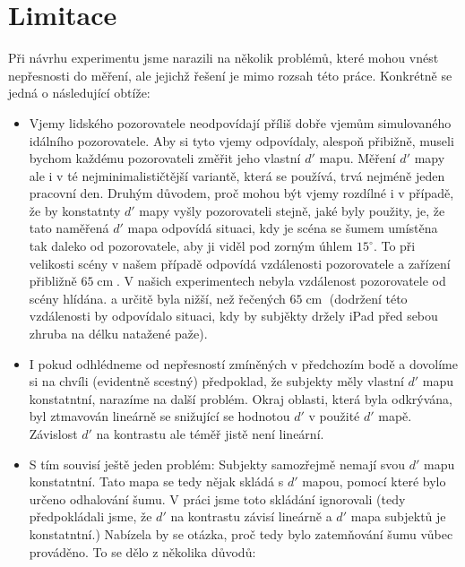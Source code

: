 \section{Limitace}

Při návrhu experimentu jsme narazili na několik problémů, které mohou vnést
nepřesnosti do měření, ale jejichž řešení je mimo rozsah této práce. Konkrétně
se jedná o následující obtíže:

\begin{itemize}
\item Vjemy lidského pozorovatele neodpovídají příliš dobře vjemům simulovaného
idálního pozorovatele. Aby si tyto vjemy odpovídaly, alespoň přibižně, museli
bychom každému pozorovateli změřit jeho vlastní $d'$ mapu. Měření $d'$ mapy ale
i  v té nejminimalističtější variantě, která se používá, trvá nejméně jeden
pracovní den. Druhým důvodem, proč mohou být vjemy rozdílné i v případě, že by
konstatnty $d'$ mapy vyšly pozorovateli stejně, jaké byly použity, je, že tato
naměřená $d'$ mapa odpovídá situaci, kdy je scéna se šumem umístěna tak daleko
od pozorovatele, aby ji viděl pod zorným úhlem $15^\circ$. To při velikosti
scény v našem případě odpovídá vzdálenosti pozorovatele a zařízení přibližně
$65 \operatorname{cm}$. V našich experimentech nebyla vzdálenost pozorovatele od
scény hlídána. a určitě byla nižší, než řečených $65 \operatorname{cm}$
(dodržení této vzdálenosti by odpovídalo situaci, kdy by subjěkty držely iPad
před sebou zhruba na délku natažené paže). 

\item I pokud odhlédneme od nepřesností zmíněných v předchozím bodě a dovolíme
si na chvíli (evidentně scestný) předpoklad, že subjekty měly vlastní $d'$ mapu
konstatntní, narazíme na další problém. Okraj oblasti, která byla odkrývána,
byl ztmavován lineárně se snižující se hodnotou $d'$ v použité $d'$ mapě.
Závislost $d'$ na kontrastu ale téměř jistě
není lineární.

\item S tím souvisí ještě jeden problém: Subjekty samozřejmě nemají svou $d'$
mapu konstatntní. Tato mapa se tedy nějak skládá s $d'$ mapou, pomocí které
bylo určeno odhalování šumu. V práci jsme toto skládání ignorovali (tedy
předpokládali jsme, že $d'$ na kontrastu závisí lineárně a $d'$ mapa subjektů
je konstatntní.) Nabízela by se otázka, proč tedy bylo zatemňování šumu vůbec
prováděno. To se dělo z několika důvodů:

\begin{itemize}


\end{itemize}
\end{itemize}

